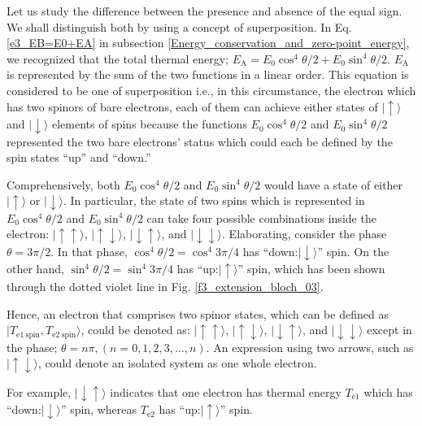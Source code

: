 \documentclass[%
 reprint,
 amsmath,amssymb,
 aps,
]{revtex4-1}
\numberwithin{equation}{section}
\begin{document}
    Let us study the difference between the presence and absence of the equal sign. We shall distinguish both by using a concept of superposition. In Eq. \ref{e3_EB=E0+EA} in subsection \ref{Energy_conservation_and_zero-point_energy}, we recognized that the total thermal energy; $E_{\mathrm{A}} = E_{0} \cos^{4} \theta / 2 + E_{0} \sin^{4} \theta /2 $. $E_{\mathrm{A}}$ is represented by the sum of the two functions in a linear order. This equation is considered to be one of superposition i.e., in this circumstance, the electron which has two spinors of bare electrons, each of them can achieve either states of $\mid \uparrow \rangle$ and $\mid \downarrow \rangle$ elements of spins because the functions $E_{0} \cos^{4} \theta /2 $ and $E_{0} \sin^{4} \theta /2 $ represented the two bare electrons' status which could each be defined by the spin states ``up'' and ``down.''

    Comprehensively, both $E_{0} \cos^{4} \theta / 2 $ and $E_{0} \sin^{4}  \theta / 2 $ would have a state of either $\mid \uparrow \rangle$ or $\mid \downarrow \rangle$. In particular, the state of two spins which is represented in $E_{0} \cos^{4} \theta /2 $ and $E_{0} \sin^{4} \theta /2 $ can take four possible combinations inside the electron: $\mid \uparrow \uparrow \rangle$, $\mid \uparrow \downarrow \rangle$, $\mid \downarrow \uparrow \rangle$, and $\mid \downarrow \downarrow \rangle$. Elaborating, consider the phase $ \theta = 3\pi /2 $. In that phase, $\cos^{4} \theta / 2 = \cos^{4} 3\pi /4 $ has ``down:$\mid \downarrow \rangle$'' spin. On the other hand, $\sin^{4} \theta / 2 = \sin^{4} 3 \pi /4 $ has ``up:$\mid \uparrow \rangle$'' spin, which has been shown through the dotted violet line in Fig. \ref{f3_extension_bloch_03}.

    Hence, an electron that comprises two spinor states, which can be defined as $\mid T_{\mathrm{e1 \ spin}}, T_{\mathrm{e2 \ spin}} \rangle$, could be denoted as: $\mid \uparrow \uparrow \rangle$, $\mid \uparrow \downarrow \rangle$, $\mid \downarrow \uparrow \rangle$, and $\mid \downarrow \downarrow \rangle$ except in the phase; $\theta = n \pi, (n= 0,1,2,3,...,n)$. An expression using two arrows, such as $\mid \uparrow  \downarrow \rangle$, could denote an isolated system as one whole electron.

    For example, $\mid \downarrow  \uparrow \rangle$ indicates that one electron has thermal energy $T_{\mathrm{e1}}$ which has ``down:$\mid \downarrow \rangle$'' spin, whereas $T_{\mathrm{e2}}$ has ``up:$\mid \uparrow \rangle$'' spin.
\end{document}
